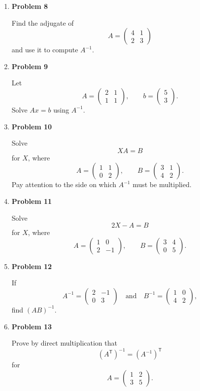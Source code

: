 \begin{enumerate}
\item \textbf{Problem 8}\par
Find the adjugate of
\[
A=\begin{pmatrix}
4&1\\
2&3
\end{pmatrix}
\]
and use it to compute \(A^{-1}\).

\item \textbf{Problem 9}\par
Let
\[
A=\begin{pmatrix}2&1\\1&1\end{pmatrix},
\qquad
b=\begin{pmatrix}5\\3\end{pmatrix}.
\]
Solve \(Ax=b\) using \(A^{-1}\).

\item \textbf{Problem 10}\par
Solve
\[
XA=B
\]
for \(X\), where
\[
A=\begin{pmatrix}1&1\\0&2\end{pmatrix},
\qquad
B=\begin{pmatrix}3&1\\4&2\end{pmatrix}.
\]
Pay attention to the side on which \(A^{-1}\) must be multiplied.

\item \textbf{Problem 11}\par
Solve
\[
2X-A=B
\]
for \(X\), where
\[
A=\begin{pmatrix}1&0\\2&-1\end{pmatrix},
\qquad
B=\begin{pmatrix}3&4\\0&5\end{pmatrix}.
\]

\item \textbf{Problem 12}\par
If
\[
A^{-1}=\begin{pmatrix}2&-1\\0&3\end{pmatrix}
\quad\text{and}\quad
B^{-1}=\begin{pmatrix}1&0\\4&2\end{pmatrix},
\]
find \((AB)^{-1}\).

\item \textbf{Problem 13}\par
Prove by direct multiplication that
\[
(A^{\mathsf T})^{-1}=(A^{-1})^{\mathsf T}
\]
for
\[
A=\begin{pmatrix}1&2\\3&5\end{pmatrix}.
\]


\end{enumerate}
